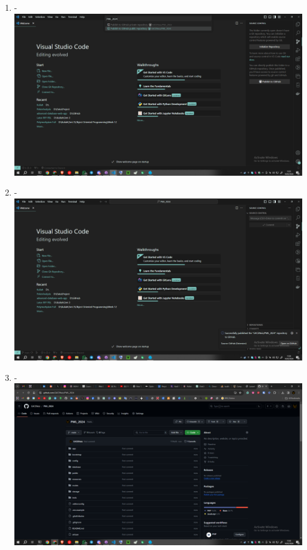 \documentclass[12pt,titlepage]{article}
\begin{document}
\begin{enumerate}[label= \alph*.]
    \item - \\ \includegraphics[width=.9\textwidth]{images/figures/Github Publish 4.png}
    \newpage
    \item - \\ \includegraphics[width=.9\textwidth]{images/figures/Github Publish 5.png}
    \item - \\ \includegraphics[width=.9\textwidth]{images/figures/Github Publish 6.png}
\end{enumerate}

\newpage
\end{document}

